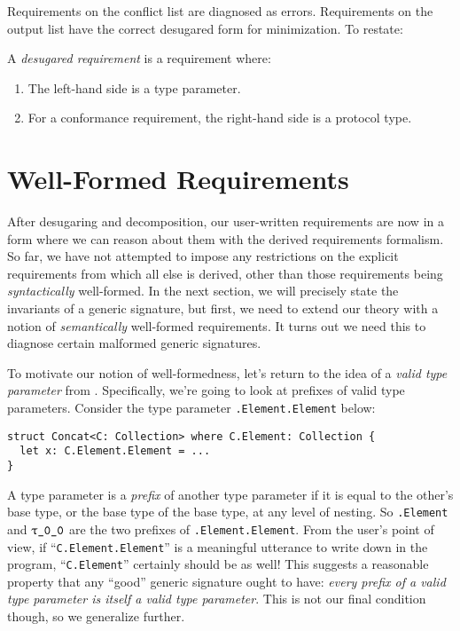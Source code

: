 \documentclass[../generics]{subfiles}
\begin{document}
Requirements on the conflict list are diagnosed as errors. Requirements on the output list have the correct desugared form for minimization. To restate:
\begin{definition}\label{desugaredrequirementdef}
A \emph{desugared requirement} is a requirement where:
\begin{enumerate}
\item The left-hand side is a type parameter.
\item For a conformance requirement, the right-hand side is a protocol type.
\end{enumerate}
\end{definition}

\section{Well-Formed Requirements}\label{generic signature validity}

After desugaring and decomposition, our user-written requirements are now in a form where we can reason about them with the derived requirements formalism. So far, we have not attempted to impose any restrictions on the explicit requirements from which all else is derived, other than those requirements being \emph{syntactically} well-formed. In the next section, we will precisely state the invariants of a generic signature, but first, we need to extend our theory with a notion of \emph{semantically} well-formed requirements. It turns out we need this to diagnose certain malformed generic signatures.

To motivate our notion of well-formedness, let's return to the idea of a \emph{valid type parameter} from . Specifically, we're going to look at prefixes of valid type parameters. Consider the type parameter \texttt{\rT.Element.Element} below:
\begin{Verbatim}
struct Concat<C: Collection> where C.Element: Collection {
  let x: C.Element.Element = ...
}
\end{Verbatim}

A type parameter is a \emph{prefix} of another type parameter if it is equal to the other's base type, or the base type of the base type, at any level of nesting. So \texttt{\rT.Element} and $\texttt{$\uptau$\_0\_0}$ are the two prefixes of \texttt{\rT.Element.Element}. From the user's point of view, if ``\texttt{C.Element.Element}'' is a meaningful utterance to write down in the program, ``\texttt{C.Element}'' certainly should be as well! This suggests a reasonable property that any ``good'' generic signature ought to have: \textsl{every prefix of a valid type parameter is itself a valid type parameter}. This is not our final condition though, so we generalize further.
\end{document}
